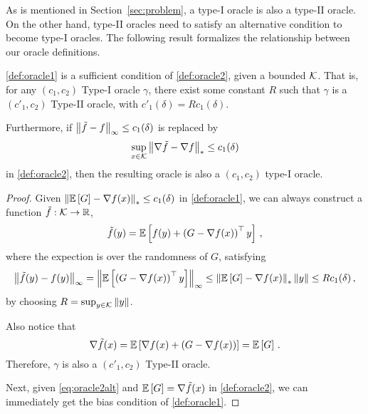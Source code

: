 


As is mentioned in Section~\ref{sec:problem}, a type-I oracle is also a type-II oracle. On the other hand, type-II oracles need to satisfy an alternative condition to become type-I oracles. The following result formalizes the relationship between our oracle definitions.
\begin{theorem}\label{thm:typered}
\cref{def:oracle1} is a sufficient condition of \cref{def:oracle2}, given a bounded $\mathcal{K}$. That is, for any $(c_1,c_2)$ Type-I oracle $\gamma$, there exist some constant $R$ such that  $\gamma$ is a $(c'_1,c_2)$ Type-II oracle, with $c'_1(\delta)=Rc_1(\delta)$.

Furthermore, if $\left\|\tilde{f}-f\right\|_\infty \le c_1(\delta)$ is replaced by 
\begin{align}
\label{eq:oracle2alt}
\sup_{x\in \mathcal{K}}\left\|\nabla \tilde{f}- \nabla f\right\|_* \le c_1(\delta)
\end{align}
in \cref{def:oracle2}, then the resulting oracle is also a $(c_1,c_2)$ type-I oracle.
\end{theorem}

\begin{proof}
Given $\left\| \mathbb{E}\left[G\right]  - \nabla f(x)  \right\|_* \le c_1(\delta) $ in \cref{def:oracle1}, we can always construct a function $\tilde{f}:\mathcal{K} \to \mathbb{R}$,
\[
\tilde{f}(y) =\mathbb{E}\left[ f(y)+ \left( G-\nabla f(x) \right)^\top y\right] \,,
\]
where the expection is over the randomness of $G$, satisfying
\begin{align*}
\left\|\tilde{f}(y)-f(y)\right\|_{\infty}
=
 \left\| \mathbb{E}\left[\left( G-\nabla f(x) \right)^\top y\right]\right\|_{\infty}
 \le \left\|\mathbb{E}\left[G\right]-\nabla f(x)\right\|_* \left\|y\right\|
 \le  Rc_1(\delta)\,,
\end{align*}
by choosing $R = \sup_{y \in \mathcal{K}}\left\|y\right\|$.

Also notice that
\[
 \nabla \tilde{f}(x) = \mathbb{E}\left[\nabla f(x)+ \left( G-\nabla f(x)\right)\right]
 =\mathbb{E}\left[G\right]\,.
\]
Therefore, $\gamma$ is also a $(c'_1,c_2)$ Type-II oracle.

Next, given \eqref{eq:oracle2alt} and $\mathbb{E}\left[G\right]=\nabla \tilde{f}(x)$ in \cref{def:oracle2}, we can immediately get the bias condition of \cref{def:oracle1}.
\end{proof}

